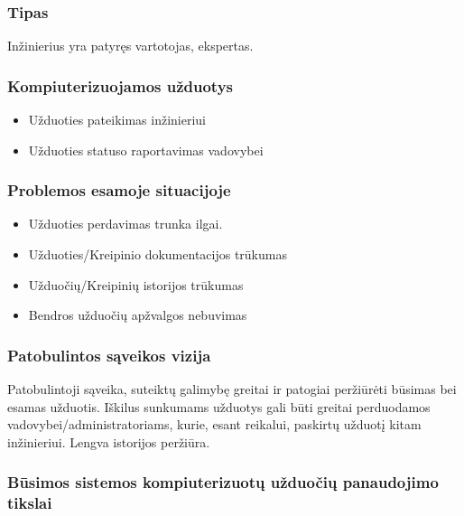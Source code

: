 			
		\subsubsection{Tipas}
		
		Inžinierius yra patyręs vartotojas, ekspertas.		

		
		\subsubsection{Kompiuterizuojamos užduotys}
		
		\begin{itemize}
			\item Užduoties pateikimas inžinieriui
			\item Užduoties statuso raportavimas vadovybei
		\end{itemize}

		
		\subsubsection{Problemos esamoje situacijoje}
		
		\begin{itemize}
			\item Užduoties perdavimas trunka ilgai.
			\item Užduoties/Kreipinio dokumentacijos trūkumas
			\item Užduočių/Kreipinių istorijos trūkumas
			\item Bendros užduočių apžvalgos nebuvimas 
		\end{itemize}

		
		\subsubsection{Patobulintos sąveikos vizija}
		
		Patobulintoji sąveika, suteiktų galimybę greitai ir patogiai peržiūrėti būsimas bei esamas užduotis.
		Iškilus sunkumams užduotys gali būti greitai perduodamos vadovybei/administratoriams, kurie, esant reikalui, paskirtų užduotį kitam inžinieriui.
		Lengva istorijos peržiūra.

		
		\subsubsection{Būsimos sistemos kompiuterizuotų užduočių panaudojimo tikslai}

